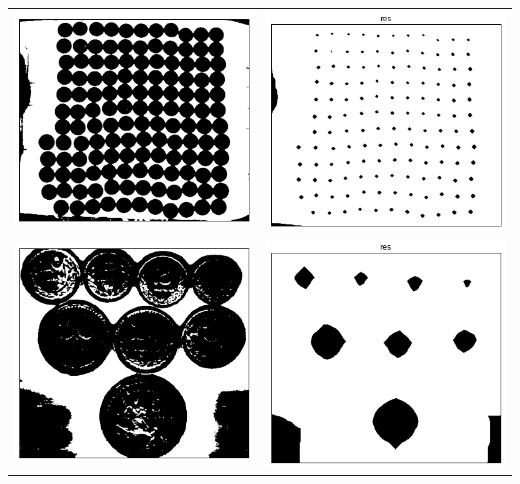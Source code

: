 \documentclass[12pt, a4paper]{article}
\begin{document}
\begin{center}
		\begin{tabular}{c c}
			\includegraphics[width=8cm]{Money_15_bin.png} & \includegraphics[width=8cm]{Money_15_res.png} \\
			\includegraphics[width=8cm]{Money_16_bin.png} & \includegraphics[width=8cm]{Money_16_res.png} \\
		\end{tabular}
		\end{center}

		
\end{document}
